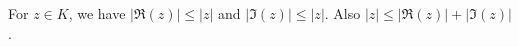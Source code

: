 For $z \in K$, we have $|\Re(z)| \leq |z|$ and $|\Im(z)| \leq |z|$. Also $|z| \leq |\Re(z)| + |\Im(z)|$.